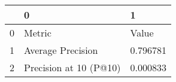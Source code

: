 \begin{tabular}{lll}
\toprule
{} &                       0 &         1 \\
\midrule
0 &                  Metric &     Value \\
1 &       Average Precision &  0.796781 \\
2 &  Precision at 10 (P@10) &  0.000833 \\
\bottomrule
\end{tabular}
